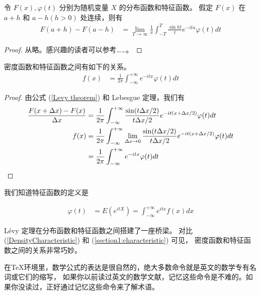 \documentclass[12pt,a4paper]{article}
\def\attention{\lettrine[lines=2,lraise=0,nindent=0em]{\large\textdbend\hspace{1mm}}{}}
\begin{document}
\begin{theorem}[L\'{e}vy\index{L\'{e}vy 定理}]
令 $F(x),\varphi(t)$ 分别为随机变量 $X$ 的分布函数和特征函数。
假定 $F(x)$ 在 $a+h$ 和 $a-h (h>0)$ 处连续，则有
\begin{align}
 \label{Levy theorem}  %
F(a+h)-F(a-h)&=\lim_{T\rightarrow\infty}\frac{1}{\pi}\int^{T}_{-T}\frac{\sin ht}{t} 
e^{-ita}\varphi(t)dt
\end{align}
\end{theorem}
\begin{proof}
  从略。感兴趣的读者可以参考……。
\end{proof}


\begin{corollary}
密度函数和特征函数之间有如下的关系。
\begin{align}
 \label{DensityCharacteristic}   %
  f(x)&=\frac{1}{2\pi}\int^{+\infty}_{-\infty} e^{-itx}\varphi(t)dt
\end{align}
\end{corollary}

\begin{proof}
由公式 (\ref{Levy theorem}) 和 Lebesgue 定理，我们有
\begin{align*}
 \frac{F(x+\Delta x)-F(x)}{\Delta x}&=\frac{1}{2\pi}\int^{+\infty}_{-\infty}
 \frac{\sin(t\Delta x/2)}{t\Delta x/2} e^{-it(x+\Delta x/2)}\varphi(t) dt\\
  f(x)&=\frac{1}{2\pi}\int^{+\infty}_{-\infty}\lim_{\Delta x\rightarrow 0}
 \frac{\sin(t\Delta x/2)}{t\Delta x/2} e^{-it(x+\Delta x/2)}\varphi(t) dt\\
  &=\frac{1}{2\pi}\int^{+\infty}_{-\infty} e^{-itx}\varphi(t)dt\qedhere
\end{align*}
\end{proof}

我们知道特征函数的定义是

\begin{align}
 \label{section1:characteristic}   %
 \varphi(t)&= E(e^{itX})=\int^{+\infty}_{-\infty} e^{itx} f(x)dx
\end{align}

L\'{e}vy 定理在分布函数和特征函数之间搭建了一座桥梁。
对比 (\ref{DensityCharacteristic}) 和 (\ref{section1:characteristic}) 可见，
密度函数和特征函数之间的关系非常巧妙。

                                                                                                                 
\attention 在\TeX 环境里，数学公式的表达是很自然的，绝大多数命令就是英文的数学专有名词或它们的缩写，
如果你以前读过英文的数学文献，记忆这些命令是不难的。如果你没读过，正好通过记忆这些命令来了解术语。
\end{document}
